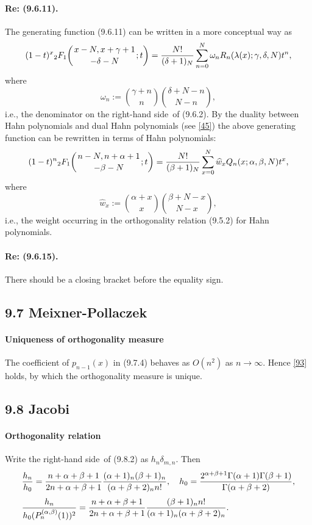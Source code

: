 \documentclass[twoside,11pt]{article}
\newcommand\sa{\smallskipamount}
\newcommand\sLP{\\[\sa]}
\newcommand\al\alpha
\newcommand\be\beta
\newcommand\ga\gamma
\newcommand\de\delta
\newcommand\la\lambda
\newcommand\om\omega
\newcommand\Ga{\Gamma}
\newcommand\iy\infty
\newcommand{\hyp}[5]{ \mbox{}_{#1}F_{#2}\!\left(
  \genfrac{}{}{0pt}{}{#3}{#4};#5\right)}
\newcommand\RHS{right-hand side}
\begin{document}
\paragraph{Re: (9.6.11).}
The generating function (9.6.11) can be written in a more conceptual way as
\begin{equation}
(1-t)^x \hyp21{x-N,x+\ga+1}{-\de-N}t=\frac{N!}{(\de+1)_N} 
\sum_{n=0}^N \om_n R_n(\la(x);\ga,\de,N) t^n,
\label{2}
\end{equation}
where
\begin{equation}
\om_n:=\binom{\ga+n}n \binom{\de+N-n}{N-n},
\label{3}
\end{equation}
i.e., the denominator on the \RHS\ of (9.6.2).
By the duality between Hahn polynomials and dual Hahn polynomials (see \eqref{45}) the above generating function can be rewritten in
terms of Hahn polynomials:
\begin{equation}
(1-t)^n \hyp21{n-N,n+\al+1}{-\be-N}t=\frac{N!}{(\be+1)_N} 
\sum_{x=0}^N \widehat{w}_x Q_n(x;\al,\be,N) t^x,
\label{4}
\end{equation}
where
\begin{equation}
\widehat{w}_x:=\binom{\al+x}x \binom{\be+N-x}{N-x},
\label{5}
\end{equation}
i.e., the weight occurring in the orthogonality relation (9.5.2)
for Hahn polynomials.
\paragraph{Re: (9.6.15).}
There should be a closing bracket before the equality sign.
%
\subsection*{9.7 Meixner-Pollaczek}
\label{sec9.7}
%
\paragraph{Uniqueness of orthogonality measure}
The coefficient of $p_{n-1}(x)$ in (9.7.4) behaves as $O(n^2)$ as $n\to\iy$.
Hence \eqref{93} holds, by which the orthogonality measure is unique.
%
\subsection*{9.8 Jacobi}
\label{sec9.8}
%
\paragraph{Orthogonality relation}
Write the \RHS\ of (9.8.2) as $h_n \de_{m,n}$. Then
\begin{equation}
\begin{split}
&\frac{h_n}{h_0}=
\frac{n+\al+\be+1}{2n+\al+\be+1} 
\frac{(\al+1)_n(\be+1)_n}{(\al+\be+2)_n n!} ,\quad
h_0=\frac{2^{\al+\be+1}\Ga(\al+1)\Ga(\be+1)}{\Ga(\al+\be+2)} ,\sLP
&\frac{h_n}{h_0 (P_n^{(\al,\be)}(1))^2}=
\frac{n+\al+\be+1}{2n+\al+\be+1} 
\frac{(\be+1)_n n!}{(\al+1)_n (\al+\be+2)_n} .
\end{split}
\label{60}
\end{equation}
\end{document}
